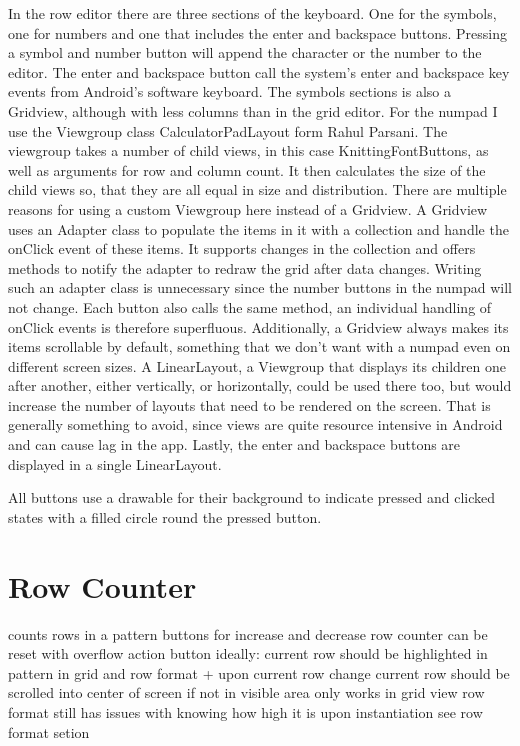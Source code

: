 In the row editor there are three sections of the keyboard. One for the symbols, one for numbers and one that includes the enter and backspace buttons. Pressing a symbol and number button will append the character or the number to the editor. The enter and backspace button call the system’s enter and backspace key events from Android’s software keyboard.
The symbols sections is also a Gridview, although with less columns than in the grid editor. For the numpad I use the Viewgroup class CalculatorPadLayout form Rahul Parsani. The viewgroup takes a number of child views, in this case KnittingFontButtons, as well as arguments for row and column count. It then calculates the size of the child views so, that they are all equal in size and distribution. There are multiple reasons for using a custom Viewgroup here instead of a Gridview. A Gridview uses an Adapter class to populate the items in it with a collection and handle the onClick event of these items. It supports changes in the collection and offers methods to notify the adapter to redraw the grid after data changes. Writing such an adapter class is unnecessary since the number buttons in the numpad will not change. Each button also calls the same method, an individual handling of onClick events is therefore superfluous. Additionally, a Gridview always makes its items scrollable by default, something that we don’t want with a numpad even on different screen sizes. A LinearLayout, a Viewgroup that displays its children one after another, either vertically, or horizontally, could be used there too, but would increase the number of layouts that need to be rendered on the screen. That is generally something to avoid, since views are quite resource intensive in Android and can cause lag in the app. Lastly, the enter and backspace buttons are displayed in a single LinearLayout.

All buttons use a drawable for their background to indicate pressed and clicked states with a filled circle round the pressed button.

\section{Row Counter}
counts rows in a pattern
buttons for increase and decrease row counter
can be reset with overflow action button
ideally: current row should be highlighted in pattern in grid and row format
+ upon current row change current row should be scrolled into center of screen if not in visible area
only works in grid view
row format still has issues with knowing how high it is upon instantiation
see row format setion

